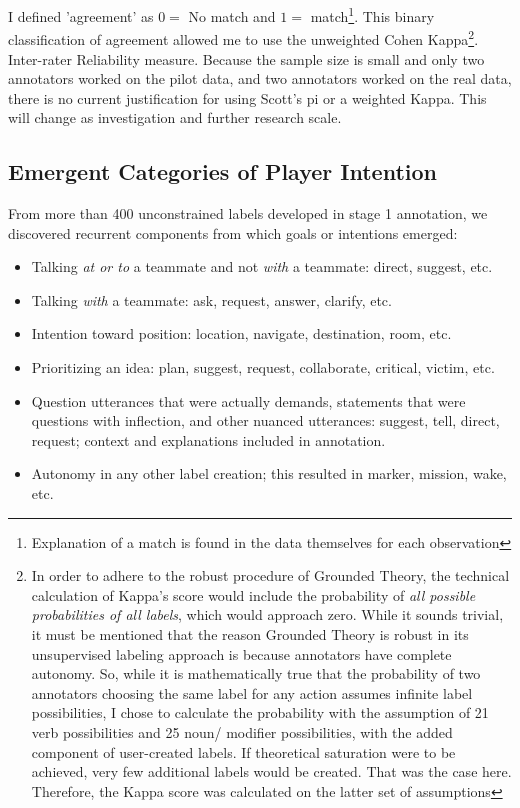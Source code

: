 \documentclass[10pt]{article}
\begin{document}
I defined 'agreement' as $0 = $ No match and $1 =$ match\footnote{Explanation of a match is found in the data themselves for each observation}. This binary classification of agreement allowed me to use the unweighted Cohen Kappa\footnote{In order to adhere to the robust procedure of Grounded Theory, the technical calculation of Kappa's score would include the probability of \textit{all possible probabilities of all labels}, which would approach zero. While it sounds trivial, it must be mentioned that the reason Grounded Theory is robust in its unsupervised labeling approach is because annotators have complete autonomy. So, while it is mathematically true that the probability of two annotators choosing the same label for any action assumes infinite label possibilities, I chose to calculate the probability with the assumption of 21 verb possibilities and 25 noun/ modifier possibilities, with the added component of user-created labels. If theoretical saturation were to be achieved, very few additional labels would be created. That was the case here. Therefore, the Kappa score was calculated on the latter set of assumptions}. Inter-rater Reliability measure. Because the sample size is small and only two annotators worked on the pilot data, and two annotators worked on the real data, there is no current justification for using Scott's pi or a weighted Kappa. This will change as investigation and further research scale.




\subsection{Emergent Categories of Player Intention}
From more than 400 unconstrained labels developed in stage 1 annotation, we discovered recurrent components from which goals or intentions emerged:

\begin{itemize}
    \item Talking \emph{at or to} a teammate and not \emph{with} a teammate: direct, suggest, etc.
    \item Talking \emph{with} a teammate: ask, request, answer, clarify, etc.
    \item Intention toward position: location, navigate, destination, room, etc.
    \item Prioritizing an idea: plan, suggest, request, collaborate, critical, victim, etc.
    \item Question utterances that were actually demands, statements that were questions with inflection, and other nuanced utterances: suggest, tell, direct, request; context and explanations included in annotation.
    \item Autonomy in any other label creation; this resulted in marker, mission, wake, etc.
\end{itemize}
\end{document}
